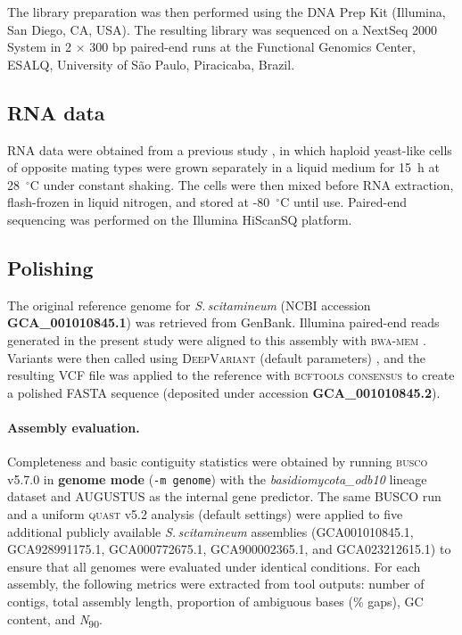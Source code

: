 \documentclass[Journal,letterpaper]{ascelike-new}
\begin{document}
The library preparation was then performed using the DNA Prep Kit (Illumina, San
Diego, CA, USA). The resulting library was sequenced on a NextSeq 2000 System in
2 $\times$ 300 bp paired-end runs at the Functional Genomics Center, ESALQ, University
of São Paulo, Piracicaba, Brazil.

\subsection*{RNA data}

RNA data were obtained from a previous study \cite{sscita2015}, in which haploid
yeast-like cells of opposite mating types were grown separately in a liquid medium
for 15~h at 28~$^{\circ}$C under constant shaking. The cells were then mixed before
RNA extraction, flash-frozen in liquid nitrogen, and stored at -80~$^{\circ}$C
until use. Paired-end sequencing was performed on the Illumina HiScanSQ
platform.

\subsection*{Polishing}

The original reference genome for \textit{S.\,scitamineum} (NCBI accession
\textbf{GCA\_001010845.1}) \cite{sscita2015} was retrieved from GenBank.
Illumina paired-end reads generated in the present study were aligned to this
assembly with \textsc{bwa-mem} \cite{bwamem}.  
Variants were then called using \textsc{DeepVariant} (default parameters)
\cite{deepvariant2018}, and the resulting VCF file was applied to the reference
with \textsc{bcftools consensus} \cite{samtools} to create a polished FASTA
sequence (deposited under accession \textbf{GCA\_001010845.2}).

\paragraph{Assembly evaluation.}
Completeness and basic contiguity statistics were obtained by running
\textsc{busco} v5.7.0 \cite{busco} in \textbf{genome mode}
(\texttt{-m genome}) with the \textit{basidiomycota\_odb10} lineage dataset and
\textsc{AUGUSTUS} as the internal gene predictor.
The same BUSCO run and a uniform \textsc{quast} v5.2 analysis (default
settings) were applied to five additional publicly available
\textit{S.\,scitamineum} assemblies
(GCA001010845.1, GCA928991175.1, GCA000772675.1, GCA900002365.1,
and GCA023212615.1) to ensure that all genomes were evaluated under identical
conditions.
For each assembly, the following metrics were extracted from tool outputs:
number of contigs, total assembly length, proportion of ambiguous bases
(\% gaps), GC content, and \textit{N}\textsubscript{90}.
\end{document}
